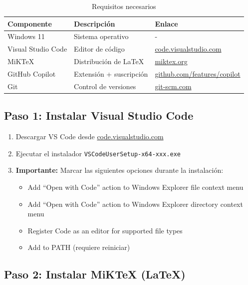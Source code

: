 \documentclass[11pt,a4paper]{article}
\newcommand{\codigo}[1]{\texttt{\textcolor{codigo}{#1}}}
\begin{document}
	\begin{table}[H]
		\centering
		\begin{tabular}{@{}lll@{}}
			\toprule
			\textbf{Componente} & \textbf{Descripción} & \textbf{Enlace} \\
			\midrule
			Windows 11 & Sistema operativo & - \\
			Visual Studio Code & Editor de código & \href{https://code.visualstudio.com}{code.visualstudio.com} \\
			MiKTeX & Distribución de LaTeX & \href{https://miktex.org}{miktex.org} \\
			GitHub Copilot & Extensión + suscripción & \href{https://github.com/features/copilot}{github.com/features/copilot} \\
			Git & Control de versiones & \href{https://git-scm.com}{git-scm.com} \\
			\bottomrule
		\end{tabular}
		\caption{Requisitos necesarios}
		\label{tab:requisitos}
	\end{table}
	
	\subsection{Paso 1: Instalar Visual Studio Code}
	
	\begin{enumerate}
		\item Descargar VS Code desde \href{https://code.visualstudio.com}{code.visualstudio.com}
		\item Ejecutar el instalador \codigo{VSCodeUserSetup-x64-xxx.exe}
		\item \textbf{Importante:} Marcar las siguientes opciones durante la instalación:
		\begin{itemize}
			\item \checkmark Add ``Open with Code'' action to Windows Explorer file context menu
			\item \checkmark Add ``Open with Code'' action to Windows Explorer directory context menu
			\item \checkmark Register Code as an editor for supported file types
			\item \checkmark Add to PATH (requiere reiniciar)
		\end{itemize}
	\end{enumerate}
	
	\subsection{Paso 2: Instalar MiKTeX (LaTeX)}
	
\end{document}
